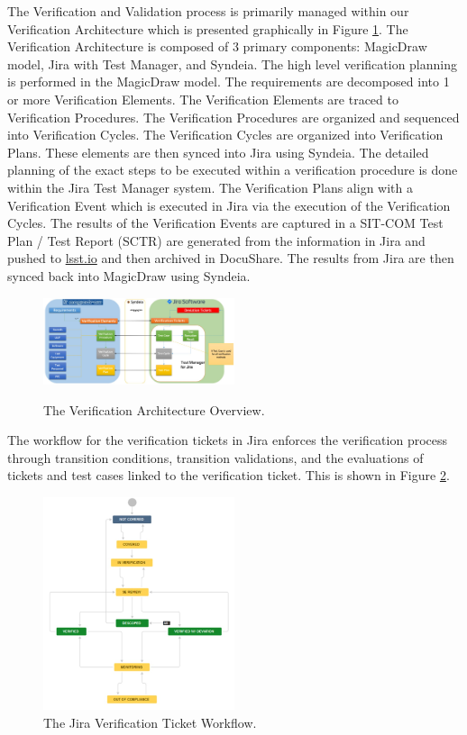 \documentclass[SE,lsstdraft,authoryear,toc]{lsstdoc}
\begin{document}
The Verification and Validation process is primarily managed within our Verification Architecture which is presented graphically in Figure \ref{fig:verification_arch}.
The Verification Architecture is composed of 3 primary components: MagicDraw model, Jira with Test Manager, and Syndeia.
The high level verification planning is performed in the MagicDraw model.
The requirements are decomposed into 1 or more Verification Elements.
The Verification Elements are traced to Verification Procedures.
The Verification Procedures are organized and sequenced into Verification Cycles.
The Verification Cycles are organized into Verification Plans.
These elements are then synced into Jira using Syndeia.
The detailed planning of the exact steps to be executed within a verification procedure is done within the Jira Test Manager system.
The Verification Plans align with a Verification Event which is executed in Jira via the execution of the Verification Cycles.
The results of the Verification Events are captured in a SIT-COM Test Plan / Test Report (SCTR) are generated from the information in Jira and pushed to \href{https://lsst.io}{lsst.io} and then archived in DocuShare.
The results from Jira are then synced back into MagicDraw using Syndeia.

\begin{figure}[h]
    \centering
    \includegraphics[width=0.5\textwidth]{static/verification_architecture}
    \label{fig:verification_arch}
    \caption{The Verification Architecture Overview.}
\end{figure}

The workflow for the verification tickets in Jira enforces the verification process through transition conditions, transition validations, and the evaluations of tickets and test cases linked to the verification ticket.
This is shown in Figure \ref{fig:verification_workflow}.

\begin{figure}[h]
    \centering
    \includegraphics[width=0.5\textwidth]{static/verification_workflow}
    \caption{The Jira Verification Ticket Workflow.}
    \label{fig:verification_workflow}
\end{figure}
\end{document}
